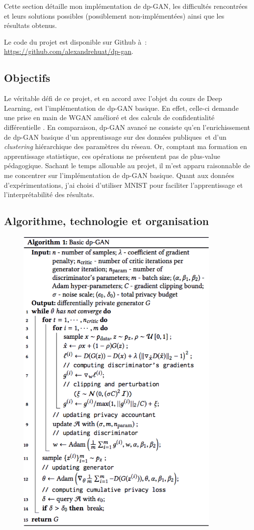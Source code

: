 \documentclass[a4paper,11pt,twoside]{article}
\theoremstyle{definition}
\newcommand{\DL}{Deep Learning}
\begin{document}
Cette section détaille mon implémentation de dp-GAN, les difficultés rencontrées et leurs solutions possibles (possiblement non-implémentées) ainsi que les résultats obtenus.

Le code du projet est disponible sur Github à : \url{https://github.com/alexandrehuat/dp-gan}.


\subsection{Objectifs}
\label{obj}

Le véritable défi de ce projet, et en accord avec l'objet du cours de \DL, est l'implémentation de dp-GAN basique. En effet, celle-ci demande une prise en main de WGAN amélioré et des calculs de confidentialité différentielle \citep{dlwdp, pinq}. En comparaison, dp-GAN avancé ne consiste qu'en l'enrichissement de dp-GAN basique d'un apprentissage sur des données publiques et d'un \textit{clustering} hiérarchique des paramètres du réseau. Or, comptant ma formation en apprentissage statistique, ces opérations ne présentent pas de plus-value pédagogique. Sachant le temps allouable au projet, il m'est apparu raisonnable de me concentrer sur l'implémentation de dp-GAN basique. Quant aux données d'expérimentations, j'ai choisi d'utiliser MNIST pour faciliter l'apprentissage et l'interprétabilité des résultats.


\subsection{Algorithme, technologie et organisation}
\label{techno}

\begin{figure}
    \includegraphics[width=10cm]{alg1.png}
\end{figure}
\end{document}
